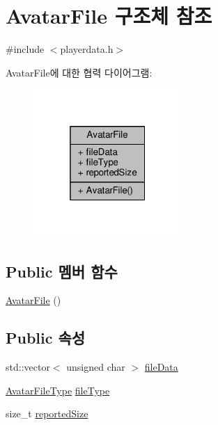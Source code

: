 \hypertarget{struct_avatar_file}{\section{Avatar\-File 구조체 참조}
\label{struct_avatar_file}
}


{\ttfamily \#include $<$playerdata.\-h$>$}



Avatar\-File에 대한 협력 다이어그램\-:\nopagebreak
\begin{figure}[H]
\begin{center}
\leavevmode
\includegraphics[width=160pt]{struct_avatar_file__coll__graph}
\end{center}
\end{figure}
\subsection*{Public 멤버 함수}
\begin{DoxyCompactItemize}
\item 
\hyperlink{struct_avatar_file_a737930aa86033509d0fd6f677512294f}{Avatar\-File} ()
\end{DoxyCompactItemize}
\subsection*{Public 속성}
\begin{DoxyCompactItemize}
\item 
std\-::vector$<$ unsigned char $>$ \hyperlink{struct_avatar_file_a6b38c3662255dfc8e33fba2188bb35b4}{file\-Data}
\item 
\hyperlink{playerdata_8h_a838468e0dd027767b891761d30d2bf39}{Avatar\-File\-Type} \hyperlink{struct_avatar_file_afd7760254880cef7bd1b464d0fea916b}{file\-Type}
\item 
size\-\_\-t \hyperlink{struct_avatar_file_a815e6f29eb421ab4732e6cd11245b4f8}{reported\-Size}
\end{DoxyCompactItemize}


